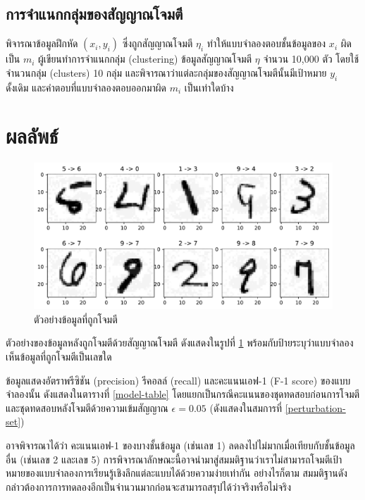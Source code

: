 \documentclass{cpepaper}
\begin{document}
\subsection{การจำแนกกลุ่มของสัญญาณโจมตี}

พิจารณาข้อมูลฝึกหัด $(x_i, y_i)$ ซึ่งถูกสัญญาณโจมตี $\eta_i$ ทำให้แบบจำลองตอบชั้นข้อมูลของ $x_i$ ผิดเป็น $m_i$ ผู้เขียนทำการจำแนกกลุ่ม (clustering) ข้อมูลสัญญาณโจมตี $\eta$ จำนวน 10,000 ตัว โดยใช้จำนวนกลุ่ม (clusters) 10 กลุ่ม และพิจารณาว่าแต่ละกลุ่มของสัญญาณโจมตีนั้นมีเป้าหมาย $y_i$ ดั้งเดิม และคำตอบที่แบบจำลองตอบออกมาผิด $m_i$ เป็นเท่าใดบ้าง

\section{ผลลัพธ์}

\begin{figure}
    \centering
    \includegraphics[width=\columnwidth]{images/adversarials.pdf}
    \caption{ตัวอย่างข้อมูลที่ถูกโจมตี}
    \label{adversarials}
\end{figure}

ตัวอย่างของข้อมูลหลังถูกโจมตีด้วยสัญญาณโจมตี ดังแสดงในรูปที่ \ref{adversarials} พร้อมกับป้ายระบุว่าแบบจำลองเห็นข้อมูลที่ถูกโจมตีเป็นเลขใด

ข้อมูลแสดงอัตราพรีซิชัน (precision) รีคอลล์ (recall) และคะแนนเอฟ-1 (F-1 score) ของแบบจำลองนั้น ดังแสดงในตารางที่ \ref{model-table} โดยแยกเป็นกรณีคะแนนของชุดทดสอบก่อนการโจมตี และชุดทดสอบหลังโจมตีด้วยความเข้มสัญญาณ $\epsilon = 0.05$ (ดังแสดงในสมการที่ \ref{perturbation-set})

อาจพิจารณาได้ว่า คะแนนเอฟ-1 ของบางชั้นข้อมูล (เช่นเลข 1) ลดลงไปไม่มากเมื่อเทียบกับชั้นข้อมูลอื่น (เช่นเลข 2 และเลข 5) การพิจารณาลักษณะนี้อาจนำมาสู่สมมติฐานว่าเราไม่สามารถโจมตีเป้าหมายของแบบจำลองการเรียนรู้เชิงลึกแต่ละแบบได้ด้วยความง่ายเท่ากัน อย่างไรก็ตาม สมมติฐานดังกล่าวต้องการการทดลองอีกเป็นจำนวนมากก่อนจะสามารถสรุปได้ว่าจริงหรือไม่จริง
\end{document}
